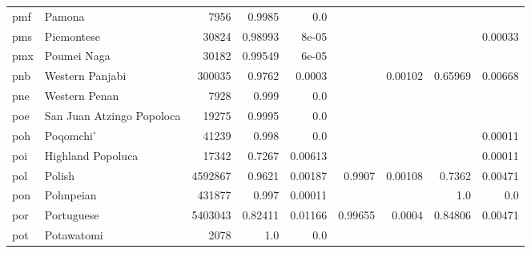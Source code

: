 \documentclass[11pt]{article}
\begin{document}
\begin{table*}[h]
{\begin{tabular}{llrrrrrrr}
pmf         & Pamona         & 7956         & 0.9985         & 0.0         &          &          &          &          \\

pms         & Piemontese         & 30824         & 0.98993         & 8e-05         &          &          &          & 0.00033         \\

pmx         & Poumei Naga         & 30182         & 0.99549         & 6e-05         &          &          &          &          \\

pnb         & Western Panjabi         & 300035         & 0.9762         & 0.0003         &          & 0.00102         & 0.65969         & 0.00668         \\

pne         & Western Penan         & 7928         & 0.999         & 0.0         &          &          &          &          \\

poe         & San Juan Atzingo Popoloca         & 19275         & 0.9995         & 0.0         &          &          &          &          \\

poh         & Poqomchi'         & 41239         & 0.998         & 0.0         &          &          &          & 0.00011         \\

poi         & Highland Popoluca         & 17342         & 0.7267         & 0.00613         &          &          &          & 0.00011         \\

pol         & Polish         & 4592867         & 0.9621         & 0.00187         & 0.9907         & 0.00108         & 0.7362         & 0.00471         \\

pon         & Pohnpeian         & 431877         & 0.997         & 0.00011         &          &          & 1.0         & 0.0         \\

por         & Portuguese         & 5403043         & 0.82411         & 0.01166         & 0.99655         & 0.0004         & 0.84806         & 0.00471         \\

pot         & Potawatomi         & 2078         & 1.0         & 0.0         &          &          &          &          \\


\end{tabular}}
\end{table*}
\end{document}

